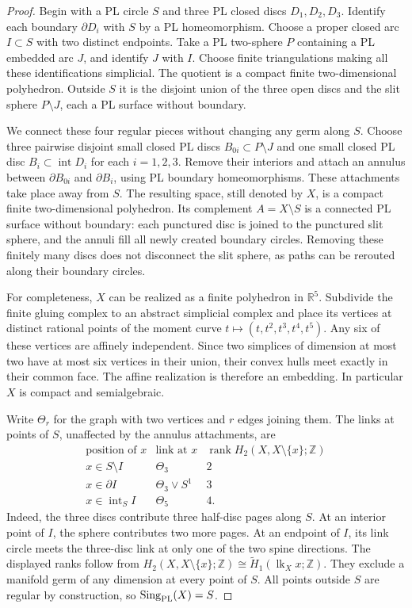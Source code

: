 \documentclass[11pt,a4paper]{article}
\theoremstyle{definition}
\begin{document}
\begin{proof}
Begin with a PL circle $S$ and three PL closed discs $D_1,D_2,D_3$.
Identify each boundary $\partial D_i$ with $S$ by a PL homeomorphism.
Choose a proper closed arc $I\subset S$ with two distinct endpoints.
Take a PL two-sphere $P$ containing a PL embedded arc $J$, and identify
$J$ with $I$.  Choose finite triangulations making all these
identifications simplicial.  The quotient is a compact finite
two-dimensional polyhedron.  Outside $S$ it is the disjoint union of
the three open discs and the slit sphere $P\setminus J$, each a PL
surface without boundary.

We connect these four regular pieces without changing any germ along
$S$.  Choose three pairwise disjoint small closed PL discs
$B_{0i}\subset P\setminus J$ and one small closed PL disc
$B_i\subset\operatorname{int}D_i$ for each $i=1,2,3$.
Remove their interiors and attach an annulus between
$\partial B_{0i}$ and $\partial B_i$, using PL boundary
homeomorphisms.  These attachments take place away from $S$.
The resulting space, still denoted by $X$, is a compact finite
two-dimensional polyhedron.  Its complement
$A=X\setminus S$ is a connected PL surface without boundary: each
punctured disc is joined to the punctured slit sphere, and the
annuli fill all newly created boundary circles.  Removing these
finitely many discs does not disconnect the slit sphere, as paths
can be rerouted along their boundary circles.

For completeness, $X$ can be realized as a finite polyhedron in
$\mathbb R^5$.  Subdivide the finite gluing complex to an abstract
simplicial complex and place its vertices at distinct rational
points of the moment curve
$t\mapsto(t,t^2,t^3,t^4,t^5)$.  Any six of these vertices are
affinely independent.  Since two simplices of dimension at most two
have at most six vertices in their union, their convex hulls meet
exactly in their common face.  The affine realization is therefore
an embedding.  In particular $X$ is compact and semialgebraic.

Write $\Theta_r$ for the graph with two vertices and $r$ edges
joining them.  The links at points of $S$, unaffected by the
annulus attachments, are
\[
\begin{array}{c|c|c}
\text{position of }x&\text{link at }x&
\operatorname{rank}H_2(X,X\setminus\{x\};\mathbb Z)\\ \hline
x\in S\setminus I&\Theta_3&2\\
x\in\partial I&\Theta_3\vee S^1&3\\
x\in\operatorname{int}_S I&\Theta_5&4.
\end{array}
\]
Indeed, the three discs contribute three half-disc pages along
$S$.  At an interior point of $I$, the sphere contributes two
more pages.  At an endpoint of $I$, its link circle meets the
three-disc link at only one of the two spine directions.  The
displayed ranks follow from
$H_2(X,X\setminus\{x\};\mathbb Z)
\cong\widetilde H_1(\operatorname{lk}_X x;\mathbb Z)$.
They exclude a manifold germ of any dimension at every point of
$S$.  All points outside $S$ are regular by construction, so
$\operatorname{Sing}_{\rm PL}(X)=S$.


\end{proof}
\end{document}
